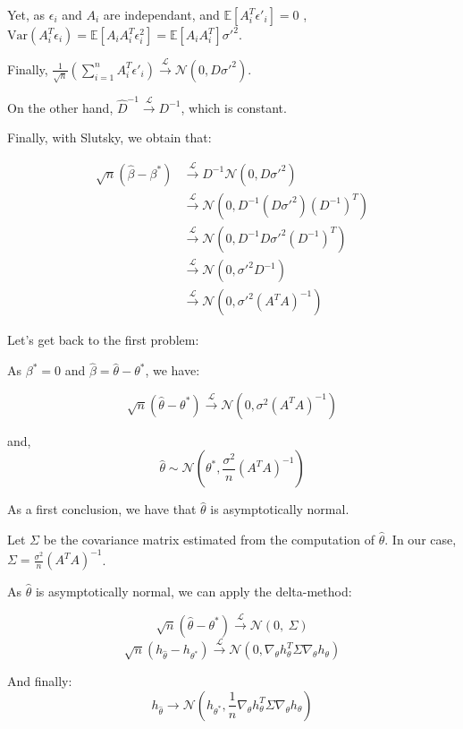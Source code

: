Yet, as $\epsilon_i $ and $  A_i $ are independant, and $\mathbb{E} [ A_i^T \epsilon'_i] = 0 $ , $\text{Var}(A_i^T \epsilon_i) = \mathbb{E}[A_i A_i ^T \epsilon_i ^2 ] = \mathbb{E} [ A_i A_i ^T ] \sigma'^2$. 

Finally, $\frac{1}{\sqrt{n}} \left( \sum_{i=1}^{n}  A_i^T \epsilon'_i \right) \xrightarrow{\mathcal{L}} \mathcal{N}(0, D \sigma'^{2})$. 

On the other hand, $\hat{D}^{-1} \xrightarrow{\mathcal{L}} D^{-1} $, which is constant.

Finally, with Slutsky, we obtain that: 

\begin{align*}
    \sqrt{n} (\hat{\beta} - \beta^*) &\xrightarrow{\mathcal{L}} D^{-1}\mathcal{N}(0, D \sigma'^2) \\
    &\xrightarrow{\mathcal{L}} \mathcal{N}(0, D^{-1} (D \sigma'^2) (D^{-1})^T) \\
    &\xrightarrow{\mathcal{L}} \mathcal{N}(0, D^{-1} D \sigma'^2 (D^{-1})^{T}) \\
    &\xrightarrow{\mathcal{L}} \mathcal{N}(0, \sigma'^2 D^{-1}) \\
    &\xrightarrow{\mathcal{L}} \mathcal{N}(0, \sigma'^2 (A^T A)^{-1})
\end{align*}


Let's get back to the first problem: 

As $\beta ^* = 0 $ and $\hat{\beta} = \hat{\theta} - \theta ^* $, we have: 

\[
\sqrt{n} (\hat{\theta} - \theta^*) \xrightarrow{\mathcal{L}} \mathcal{N}(0, \sigma^2 (A^T A)^{-1})
\]

and, 
\[
\hat{\theta} \sim \mathcal{N}(\theta^*, \frac{\sigma^2}{n} (A^T A)^{-1})
\]

As a first conclusion, we have that $\hat{\theta}$ is asymptotically normal.

Let $\Sigma$ be the covariance matrix estimated from the computation of $\hat{\theta}$. In our case, $\Sigma = \frac{\sigma^2}{n} (A^T A)^{-1}$. 

As $\hat{\theta}$ is asymptotically normal, we can apply the delta-method: 

\[
\sqrt{n} (\hat{\theta} -\theta^*) \xrightarrow{\mathcal{L}} \mathcal{N}(0, \ \Sigma)
\]
\[
\sqrt{n} (h_{\hat{\theta}} -h_{\theta^*}) \xrightarrow{\mathcal{L}} \mathcal{N}(0, \nabla_\theta h_\theta ^T \Sigma  \nabla_\theta h_\theta)
\]

And finally: 
\[
h_{\hat{\theta}} \rightarrow \mathcal{N}(h_{\theta^*}, \frac{1}{n}\nabla_\theta h_\theta ^T \Sigma  \nabla_\theta h_\theta)
\]

